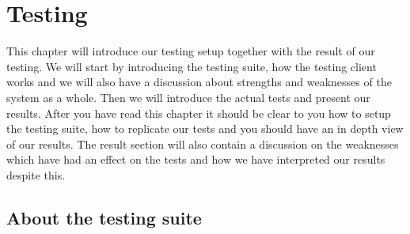 \section{Testing}\label{Testing}
	This chapter will introduce our testing setup together with the result of our testing. We will start by introducing the testing suite, how the testing client works and we will also have a discussion about strengths and weaknesses of the system as a whole. Then we will introduce the actual tests and present our results. After you have read this chapter it should be clear to you how to setup the testing suite, how to replicate our tests and you should have an in depth view of our results. The result section will also contain a discussion on the weaknesses which have had an effect on the tests and how we have interpreted our results despite this.
    
    
    \subsection{About the testing suite}\label{Testing:About}
 		
    	

	
